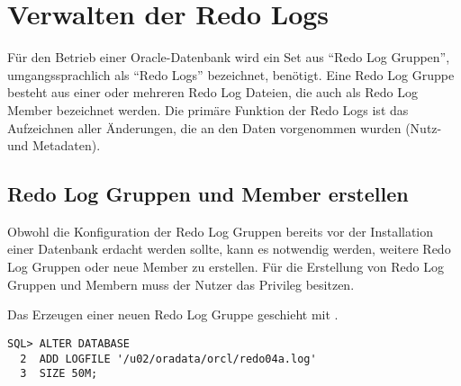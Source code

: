     \section{Verwalten der Redo Logs}
      Für den Betrieb einer Oracle-Datenbank wird ein Set aus \enquote{Redo Log Gruppen}, umgangssprachlich als \enquote{Redo Logs} bezeichnet, benötigt. Eine Redo Log Gruppe besteht aus einer oder mehreren Redo Log Dateien, die auch als Redo Log Member bezeichnet werden. Die primäre Funktion der Redo Logs ist das Aufzeichnen aller Änderungen, die an den Daten vorgenommen wurden (Nutz- und Metadaten).
      \subsection{Redo Log Gruppen und Member erstellen}
        Obwohl die Konfiguration der Redo Log Gruppen bereits vor der Installation einer Datenbank erdacht werden sollte, kann es notwendig werden, weitere Redo Log Gruppen oder neue Member zu erstellen. Für die Erstellung von Redo Log Gruppen und Membern muss der Nutzer das Privileg  besitzen.

        Das Erzeugen einer neuen Redo Log Gruppe geschieht mit .
          \begin{lstlisting}[caption={Erzeugen einer Redo Log Gruppe},label=admin30,language=oracle_sql]
SQL> ALTER DATABASE
  2  ADD LOGFILE '/u02/oradata/orcl/redo04a.log'
  3  SIZE 50M;
          \end{lstlisting}
  
